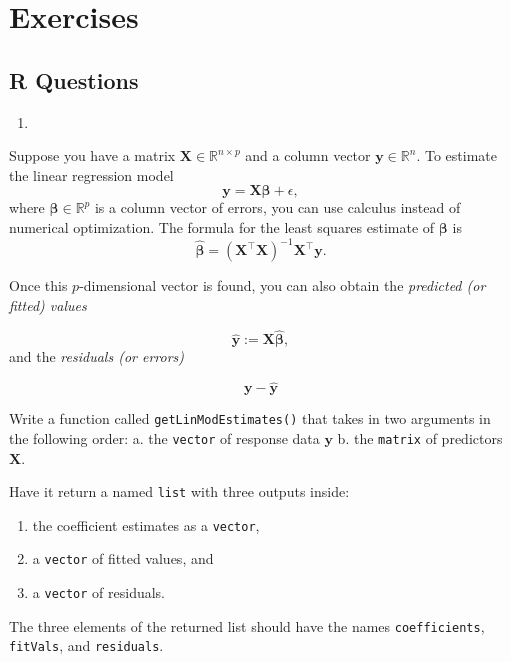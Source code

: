 \documentclass[
  12pt,
  krantz2]{krantz}
\providecommand{\tightlist}{%
  \setlength{\itemsep}{0pt}\setlength{\parskip}{0pt}}
\begin{document}
\hypertarget{exercises-4}{%
\section{Exercises}\label{exercises-4}}

\hypertarget{r-questions-4}{%
\subsection{R Questions}\label{r-questions-4}}

\begin{enumerate}
\def\labelenumi{\arabic{enumi}.}
\tightlist
\item
\end{enumerate}

Suppose you have a matrix \(\mathbf{X} \in \mathbb{R}^{n \times p}\) and a column vector \(\mathbf{y} \in \mathbb{R}^{n}\). To estimate the linear regression model
\[
\mathbf{y} = \mathbf{X}\boldsymbol{\beta} + \epsilon,
\]
where \(\boldsymbol{\beta} \in \mathbb{R}^p\) is a column vector of errors, you can use calculus instead of numerical optimization. The formula for the least squares estimate of \(\boldsymbol{\beta}\) is
\[
\hat{\boldsymbol{\beta}} = (\mathbf{X}^\intercal \mathbf{X})^{-1} \mathbf{X}^\intercal \mathbf{y}.
\]

Once this \(p\)-dimensional vector is found, you can also obtain the \emph{predicted (or fitted) values}

\[
\hat{\mathbf{y}} := \mathbf{X}\hat{\boldsymbol{\beta}},
\]
and the \emph{residuals (or errors)}

\[
\mathbf{y} - \hat{\mathbf{y}}
\]

Write a function called \texttt{getLinModEstimates()} that takes in two arguments in the following order:
a. the \texttt{vector} of response data \(\mathbf{y}\)
b. the \texttt{matrix} of predictors \(\mathbf{X}\).

Have it return a named \texttt{list} with three outputs inside:

\begin{enumerate}
\def\labelenumi{\alph{enumi}.}
\tightlist
\item
  the coefficient estimates as a \texttt{vector},
\item
  a \texttt{vector} of fitted values, and
\item
  a \texttt{vector} of residuals.
\end{enumerate}

The three elements of the returned list should have the names \texttt{coefficients}, \texttt{fitVals}, and \texttt{residuals}.
\end{document}
